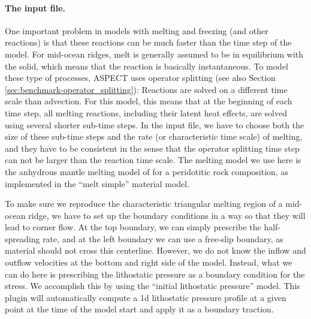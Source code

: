 \documentclass{article}
\newcommand{\aspect}{\textsc{ASPECT}}
\begin{document}
\paragraph{The input file.}
One important problem in models with melting and freezing (and other reactions) is that these reactions
can be much faster than the time step of the model. For mid-ocean ridges, melt is generally assumed to
be in equilibrium with the solid, which means that the reaction is basically instantaneous.
To model these type of processes, \aspect{} uses operator splitting (see also Section \ref{sec:benchmark-operator_splitting}): Reactions are solved on a different time scale than advection.
For this model, this means that at the beginning of each time step, all melting reactions,
including their latent heat effects, are solved using several shorter sub-time steps. In the input file,
we have to choose both the size of these sub-time steps and the rate (or characteristic time scale) of melting,
and they have to be consistent in the sense that the operator splitting time step can not be larger than
the reaction time scale.
The melting model we use here is the anhydrous mantle melting model of \cite{KSL2003} for a peridotitic
rock composition, as implemented in the ``melt simple'' material model.



To make sure we reproduce the characteristic triangular melting region of a mid-ocean ridge, we have to
set up the boundary conditions in a way so that they will lead to corner flow. At the top boundary, we can
simply prescribe the half-spreading rate, and at the left boundary we can use a free-slip boundary, as
material should not cross this centerline. However, we do not know the inflow and outflow velocities at
the bottom and right side of the model. Instead, what we can do here is prescribing the lithostatic
pressure as a boundary condition for the stress. We accomplish this by using the
``initial lithostatic pressure'' model. This plugin will automatically compute a 1d lithostatic pressure
profile at a given point at the time of the model start and apply it as a boundary traction.


\end{document}
